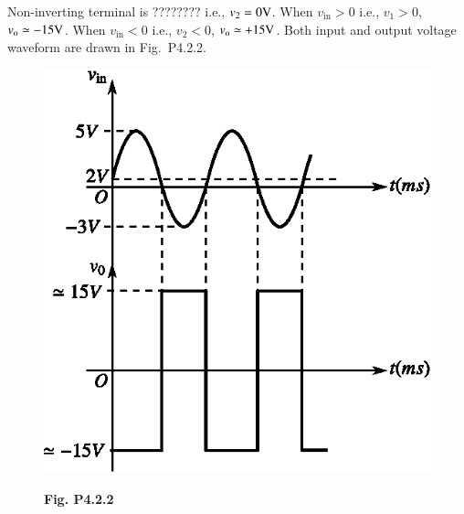 \begin{solution}
Non-inverting terminal is ???????? i.e., $v_{2}=0\textrm{V}$. When $v_{\text{in}}>0$ i.e., $v_{1}>0$, $v_{\textrm{o}}\simeq - 15\textrm{V}$. When $v_{\text{in}}<0$ i.e., $v_{2}<0$, $v_{\textrm{o}}\simeq +15\textrm{V}$. Both input and output voltage waveform are drawn in Fig.~P4.2.2.
\begin{figure}[H]
\centering
\includegraphics{chap4/figP4.2.2.eps}

\smallskip
{\bf Fig. P4.2.2}
\end{figure}
\end{solution}

